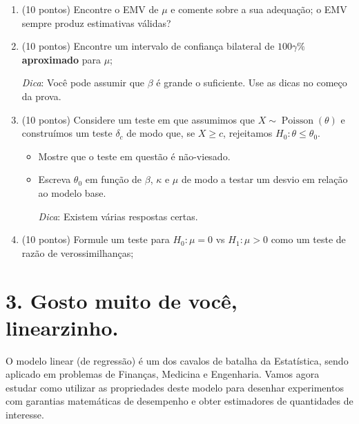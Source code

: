 \documentclass[a4paper,10pt, notitlepage]{report}
\begin{document}
\begin{enumerate}[label=\alph*)]
 \item (10 pontos) Encontre o EMV de $\mu$ e comente sobre a sua adequação; o EMV sempre produz estimativas válidas? 
  \item (10 pontos) Encontre um intervalo de confiança bilateral de $100\gamma\%$ \textbf{aproximado} para $\mu$;
  
  \textit{Dica}: Você pode assumir que $\beta$ é grande o suficiente. Use as dicas no começo da prova.
  \item (10 pontos) Considere um teste em que assumimos que $X\sim\operatorname{Poisson}(\theta)$ e construímos um teste $\delta_c$ de modo que, se $X \geq c$, rejeitamos $H_0: \theta \leq \theta_0$.
  \begin{itemize}
  \item Mostre que o teste em questão é não-viesado.
   \item Escreva $\theta_0$ em função de $\beta$, $\kappa$ e $\mu$ de modo a testar um desvio em relação ao modelo base.
   
   \textit{Dica}: Existem várias respostas certas.   
  \end{itemize}
 \item (10 pontos) Formule um teste para $H_0: \mu =0$ vs $H_1: \mu > 0$ como um teste de razão de verossimilhanças;
\end{enumerate}


\section*{3. Gosto muito de você, linearzinho.}

O modelo linear (de regressão) é um dos cavalos de batalha da Estatística, sendo aplicado em problemas de Finanças, Medicina e Engenharia.
Vamos agora estudar como utilizar as propriedades deste modelo para desenhar experimentos com garantias matemáticas de desempenho e obter estimadores de quantidades de interesse.
\end{document}

